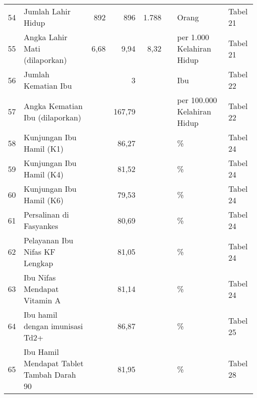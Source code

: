 \begin{small}
\begin{longtable}{rY{12em}rrrrY{5em}Y{5em}}
	 54 & Jumlah Lahir Hidup                                                          &    892 &    896 &              1.788 &          & Orang                          & Tabel 21 \\
	 55 & Angka Lahir Mati (dilaporkan)                                               &   6,68 &   9,94 &               8,32 &          & per 1.000 Kelahiran Hidup      & Tabel 21 \\
	 56 & Jumlah Kematian Ibu                                                         &        &      3 &                    &          & Ibu                            & Tabel 22 \\
	 57 & Angka Kematian Ibu (dilaporkan)                                             &        & 167,79 &                    &          & per 100.000 Kelahiran Hidup    & Tabel 22 \\
	 58 & Kunjungan Ibu Hamil (K1)                                                    &        &  86,27 &                    &          & \%                             & Tabel 24 \\
	 59 & Kunjungan Ibu Hamil (K4)                                                    &        &  81,52 &                    &          & \%                             & Tabel 24 \\
	 60 & Kunjungan Ibu Hamil (K6)                                                    &        &  79,53 &                    &          & \%                             & Tabel 24 \\
	 61 & Persalinan di Fasyankes                                                     &        &  80,69 &                    &          & \%                             & Tabel 24 \\
	 62 & Pelayanan Ibu Nifas KF Lengkap                                              &        &  81,05 &                    &          & \%                             & Tabel 24 \\
	 63 & Ibu Nifas Mendapat Vitamin A                                                &        &  81,14 &                    &          & \%                             & Tabel 24 \\
	 64 & Ibu hamil dengan imunisasi Td2+                                             &        &  86,87 &                    &          & \%                             & Tabel 25 \\
	 65 & Ibu Hamil Mendapat Tablet Tambah Darah 90                                   &        &  81,95 &                    &          & \%                             & Tabel 28 \\

\end{longtable}
\end{small}
